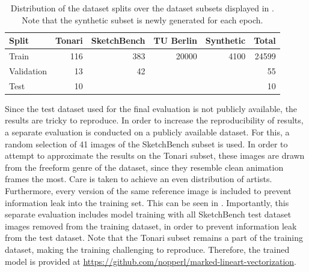 \begin{table}[]
    \centering
    \begin{tabular}{l|r|r|r|r|r}
        Split & Tonari & SketchBench & TU Berlin & Synthetic & Total \\
        \hline
        Train & 116 & 383 & 20000 & 4100 & 24599\\
        Validation & 13 & 42 & & & 55 \\
        Test & 10 & & & & 10 \\
    \end{tabular}
    \caption{Distribution of the dataset splits over the dataset subsets displayed in . Note that the synthetic subset is newly generated for each epoch.}
    \label{tab:train-test-split}
\end{table}

Since the test dataset used for the final evaluation is not publicly available, the results are tricky to reproduce. In order to increase the reproducibility of results, a separate evaluation is conducted on a publicly available dataset. For this, a random selection of 41 images of the SketchBench subset is used. In order to attempt to approximate the results on the Tonari subset, these images are drawn from the freeform genre of the dataset, since they resemble clean animation frames the most. Care is taken to achieve an even distribution of artists. Furthermore, every version of the same reference image is included to prevent information leak into the training set. This can be seen in . Importantly, this separate evaluation includes model training with all SketchBench test dataset images removed from the training dataset, in order to prevent information leak from the test dataset. Note that the Tonari subset remains a part of the training dataset, making the training challenging to reproduce. Therefore, the trained model is provided at \url{https://github.com/nopperl/marked-lineart-vectorization}.

